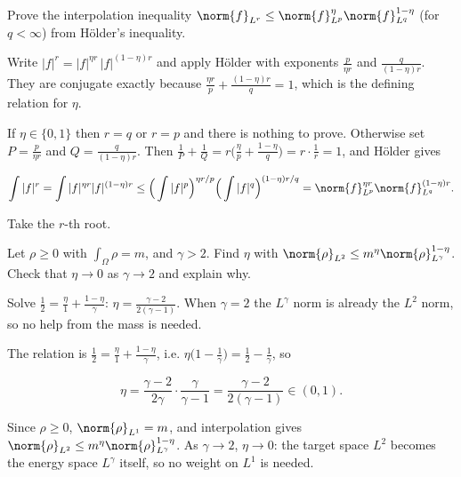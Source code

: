 \begin{exercise}
  Prove the interpolation inequality $\norm{f}_{L^r} \le \norm{f}_{L^p}^{\eta}\norm{f}_{L^q}^{1-\eta}$ (for $q < \infty$) from Hölder's inequality.
  \begin{hint}
    Write $|f|^r = |f|^{\eta r}\,|f|^{(1-\eta)r}$ and apply Hölder with exponents $\frac{p}{\eta r}$ and $\frac{q}{(1-\eta)r}$. They are conjugate exactly because $\frac{\eta r}{p} + \frac{(1-\eta)r}{q} = 1$, which is the defining relation for $\eta$.
  \end{hint}
  \begin{solution}
    If $\eta \in \{0,1\}$ then $r = q$ or $r = p$ and there is nothing to prove. Otherwise set $P = \frac{p}{\eta r}$ and $Q = \frac{q}{(1-\eta)r}$. Then $\frac1P + \frac1Q = r\big(\frac\eta p + \frac{1-\eta}{q}\big) = r\cdot\frac1r = 1$, and Hölder gives

    \[ \int|f|^r = \int|f|^{\eta r}|f|^{(1-\eta)r} \le \Big(\int|f|^p\Big)^{\eta r/p}\Big(\int|f|^q\Big)^{(1-\eta)r/q}
             = \norm{f}_{L^p}^{\eta r}\norm{f}_{L^q}^{(1-\eta)r}. \]

    Take the $r$-th root.
  \end{solution}
\end{exercise}

\begin{exercise}
  Let $\rho \ge 0$ with $\int_\Omega \rho = m$, and $\gamma > 2$. Find $\eta$ with $\norm{\rho}_{L^2} \le m^{\eta}\norm{\rho}_{L^\gamma}^{1-\eta}$. Check that $\eta \to 0$ as $\gamma \to 2$ and explain why.
  \begin{hint}
    Solve $\frac12 = \frac{\eta}{1} + \frac{1-\eta}{\gamma}$: $\eta = \frac{\gamma-2}{2(\gamma-1)}$. When $\gamma = 2$ the $L^\gamma$ norm is already the $L^2$ norm, so no help from the mass is needed.
  \end{hint}
  \begin{solution}
    The relation is $\frac12 = \frac\eta1 + \frac{1-\eta}{\gamma}$, i.e. $\eta\big(1 - \frac1\gamma\big) = \frac12 - \frac1\gamma$, so

    \[ \eta = \frac{\gamma-2}{2\gamma}\cdot\frac{\gamma}{\gamma-1} = \frac{\gamma-2}{2(\gamma-1)} \in (0,1). \]

    Since $\rho \ge 0$, $\norm{\rho}_{L^1} = m$, and interpolation gives $\norm{\rho}_{L^2} \le m^\eta\norm{\rho}_{L^\gamma}^{1-\eta}$. As $\gamma \to 2$, $\eta \to 0$: the target space $L^2$ becomes the energy space $L^\gamma$ itself, so no weight on $L^1$ is needed.
  \end{solution}
\end{exercise}

